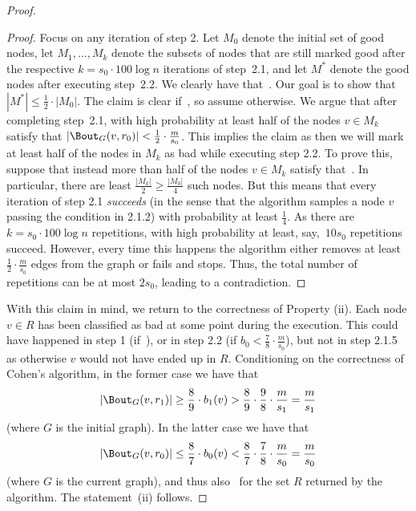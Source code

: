 \begin{proof}
\begin{proof}
Focus on any iteration of step 2. Let $M_0$ denote the initial set of good nodes, let $M_1, \dots, M_k$ denote the subsets of nodes that are still marked good after the respective $k = s_0 \cdot 100 \log n$ iterations of step~2.1, and let $M^*$ denote the good nodes after executing step~2.2. We clearly have that~. Our goal is to show that $|M^*| \leq \frac12 \cdot |M_0|$. The claim is clear if~, so assume otherwise. We argue that after completing step~2.1, with high probability at least half of the nodes $v \in M_k$ satisfy that $|\Bout_G(v, r_0)| < \tfrac12 \cdot \tfrac{m}{s_0}$. This implies the claim as then we will mark at least half of the nodes in $M_k$ as bad while executing step 2.2. To prove this, suppose that instead more than half of the nodes $v \in M_k$ satisfy that~. In particular, there are least $\frac{|M_k|}{2} \geq \frac{|M_0|}{4}$ such nodes. But this means that every iteration of step 2.1 \emph{succeeds} (in the sense that the algorithm samples a node $v$ passing the condition in 2.1.2) with probability at least $\frac14$. As there are $k = s_0 \cdot 100 \log n$ repetitions, with high probability at least, say,~$10 s_0$ repetitions succeed. However, every time this happens the algorithm either removes at least $\frac12 \cdot \frac{m}{s_0}$ edges from the graph or fails and stops. Thus, the total number of repetitions can be at most $2 s_0$, leading to a contradiction.
\end{proof}

With this claim in mind, we return to the correctness of Property (ii). Each node $v \in R$ has been classified as bad at some point during the execution. This could have happened in step 1 (if~), or in step 2.2 (if $b_0 < \frac78 \cdot \frac{m}{s_0}$), but not in step 2.1.5 as otherwise $v$ would not have ended up in $R$. Conditioning on the correctness of Cohen's algorithm, in the former case we have that
\begin{equation*}
    |\Bout_G(v, r_1)| \geq \frac89 \cdot b_1(v) > \frac89 \cdot \frac98 \cdot \frac{m}{s_1} = \frac{m}{s_1} 
\end{equation*}
(where $G$ is the initial graph). In the latter case we have that
\begin{equation*}
    |\Bout_G(v, r_0)| \leq \frac87 \cdot b_0(v) < \frac87 \cdot \frac78 \cdot \frac{m}{s_0} = \frac{m}{s_0}
\end{equation*}
(where $G$ is the current graph), and thus also~ for the set $R$ returned by the algorithm. The statement~(ii) follows.


\end{proof}
